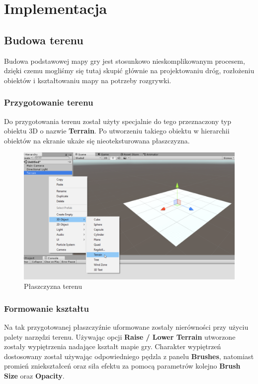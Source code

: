 \documentclass[openright]{xmgr}
\newcommand{\name}[1]{\textbf{\textcolor{NavyBlue}{#1}}}
\begin{document}
\chapter{Implementacja}
  \section{Budowa terenu}\label{sec:budowa_terenu}

    Budowa podstawowej mapy gry jest stosunkowo nieskomplikowanym procesem, dzięki czemu mogliśmy się tutaj skupić głównie na projektowaniu dróg, rozłożeniu obiektów i kształtowaniu mapy na potrzeby rozgrywki.

    \subsection{Przygotowanie terenu}

        Do przygotowania terenu został użyty specjalnie do tego przeznaczony typ obiektu 3D o nazwie \name{Terrain}. Po utworzeniu takiego obiektu w hierarchii obiektów na ekranie ukaże się nieoteksturowana płaszczyzna.

        \begin{figure}[H]
        \includegraphics[width=\textwidth]{teren_1.png}
        \caption{Płaszczyzna terenu}
        \end{figure}

    \subsection{Formowanie kształtu} 

        Na tak przygotowanej płaszczyźnie uformowane zostały nierówności przy użyciu palety narzędzi terenu. Używając opcji \name{Raise / Lower Terrain} utworzone zostały wypiętrzenia nadające kształt mapie gry. Charakter wypiętrzeń dostosowany został używając odpowiedniego pędzla z panelu \name{Brushes}, natomiast promień zniekształceń oraz siła efektu za pomocą parametrów kolejno \name{Brush Size} oraz \name {Opacity}.
\end{document}
